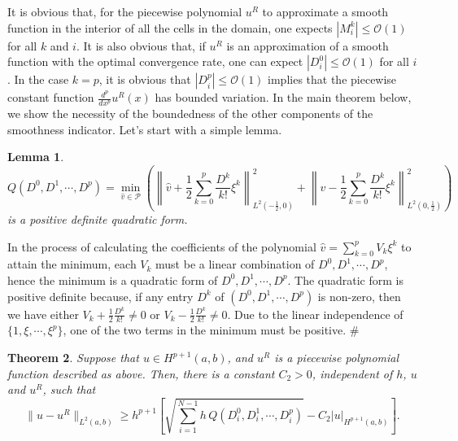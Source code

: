 \documentclass{article}
\newtheorem{theorem}{Theorem}[section]
\newtheorem{lemma}[theorem]{Lemma}
\numberwithin{equation}{section}
\begin{document}
\begin{spacing}{1.15}
It is obvious that, for the piecewise polynomial $u^R$ to approximate a smooth function
in the interior of all the cells in the domain, one expects
$|M^k_{i}| \le {\mathcal O}(1)$ for all $k$ and $i$. It is also obvious that,
if $u^R$ is an approximation of a smooth function with the optimal
convergence rate, one can expect $|D^0_{i}| \le {\mathcal O}(1)$ for all $i$.
In the case $k=p$, it is obvious that $|D^p_i| \le {\mathcal O}(1)$ implies that
the piecewise constant function $\frac{d^p}{dx^p} u^R(x)$ has
bounded variation. In the main theorem below, we show the necessity
of the boundedness of the other components of the smoothness indicator. Let's start with a simple lemma.

\begin{lemma}
$$
Q(D^0,D^1,\cdots,D^p) =  \min_{\hat{v} \in {\mathcal P}} \left(
    \left\|\hat{v}+\frac{1}{2} \sum_{k=0}^{p} \frac{D^k}{k!}\xi^k \right\|^2_{L^2 (-\frac{1}{2},0)}
+ \left\|\hat{v}- \frac{1}{2} \sum_{k=0}^{p} \frac{D^k}{k!}\xi^k \right\|^2_{L^2 (0,\frac{1}{2})}  \right)
$$
is a positive definite quadratic form.
\end{lemma}
  In the process of calculating the
coefficients of the polynomial $\hat{v} = \sum_{k=0}^{p} V_k \xi^k$
to attain the minimum, each $V_k$ must be a linear combination of
$D^0,D^1,\cdots,D^p$, hence the minimum is a quadratic form
of $D^0,D^1,\cdots,D^p$. The quadratic form is positive
definite because, if any entry $D^k$ of $(D^0,D^1,\cdots,D^p)$ is non-zero, then we have either
$V_k+\frac{1}{2}\frac{D^k}{k!} \ne 0$ or $V_k-\frac{1}{2}\frac{D^k}{k!} \ne 0$.
Due to the linear independence of $\{1,\xi,\cdots,\xi^p\}$, one of
the two terms in the minimum must be positive.  \#

\begin{theorem} \label{T2}
Suppose that $u \in H^{p+1}(a,b)$, and $u^R$ is a
piecewise polynomial function described as above. Then, there is a
constant $C_2 > 0$,  independent of $h$, $u$ and $u^R$, such that
\begin{equation} \label{L2D}
\|u - u^R\|_{L^2(a,b)} \ge  h^{p+1} \left[ \sqrt{\sum_{i=1}^{N-1} h
\, Q(D^0_i,D^1_i,\cdots,D^p_i)} - C_2 |u|_{H^{p+1}(a,b)} \right].
\end{equation}
\end{theorem}


\end{spacing}
\end{document}

